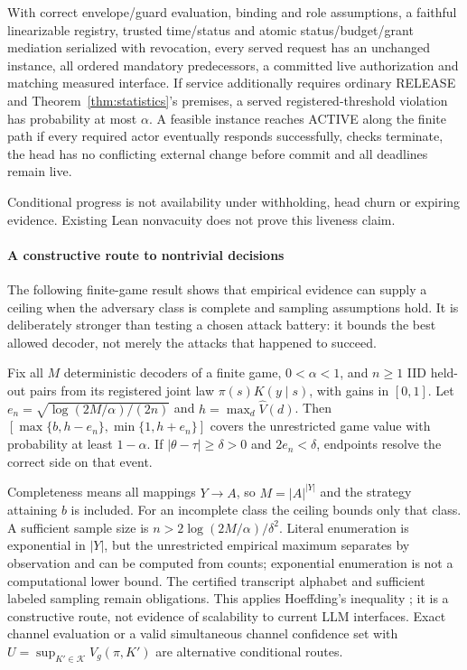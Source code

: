 \begin{theorem}
\label{thm:lifecycle}
With correct envelope/guard evaluation, binding and role assumptions, a faithful
linearizable registry, trusted time/status and atomic status/budget/grant
mediation serialized with revocation, every
served request has an unchanged instance, all ordered mandatory predecessors,
a committed live authorization and matching measured interface. If service
additionally requires ordinary RELEASE and Theorem~\ref{thm:statistics}'s
premises, a served registered-threshold violation has probability at most
$\alpha$. A feasible instance reaches ACTIVE along the finite path if every
required actor eventually responds successfully, checks terminate, the head
has no conflicting external change before commit and all deadlines remain live.
\end{theorem}
Conditional progress is not availability under withholding, head churn or
expiring evidence. Existing Lean nonvacuity does not prove this liveness claim.

\paragraph{A constructive route to nontrivial decisions}
The following finite-game result shows that empirical evidence can supply a
ceiling when the adversary class is complete and sampling assumptions hold.
It is deliberately stronger than testing a chosen attack battery: it bounds
the best allowed decoder, not merely the attacks that happened to succeed.

\begin{theorem}
\label{thm:finite-ceiling}
Fix all $M$ deterministic decoders of a finite game, $0<\alpha<1$, and
$n\ge1$ IID held-out pairs from its registered joint law $\pi(s)K(y\mid s)$,
with gains in $[0,1]$. Let
$e_n=\sqrt{\log(2M/\alpha)/(2n)}$ and
$h=\max_d\widehat V(d)$. Then
$[\max\{b,h-e_n\},\min\{1,h+e_n\}]$ covers the unrestricted game value with
probability at least $1-\alpha$. If $|\theta-\tau|\ge\delta>0$ and
$2e_n<\delta$, endpoints resolve the correct side on that event.
\end{theorem}
Completeness means all mappings $Y\to A$, so $M=|A|^{|Y|}$ and the strategy
attaining $b$ is included. For an incomplete class the ceiling bounds only
that class. A sufficient sample size is
$n>2\log(2M/\alpha)/\delta^2$. Literal enumeration is exponential in $|Y|$,
but the unrestricted empirical maximum separates by observation and can be
computed from counts; exponential enumeration is not a computational lower
bound. The certified transcript alphabet and sufficient labeled sampling
remain obligations. This applies Hoeffding's inequality
\citep{hoeffding1963bounded}; it is a
constructive route, not evidence of scalability to current LLM interfaces.
Exact channel evaluation or a valid simultaneous channel confidence set
with $U=\sup_{K'\in\mathcal K}V_g(\pi,K')$ are alternative conditional routes.

